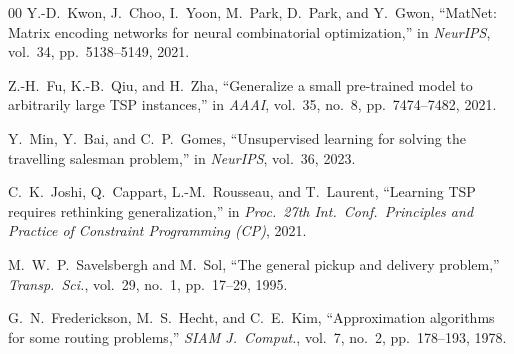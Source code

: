 \documentclass[conference]{IEEEtran}
\begin{document}
\begin{thebibliography}{00}
 Y.-D.~Kwon, J.~Choo, I.~Yoon, M.~Park, D.~Park, and Y.~Gwon, ``MatNet: Matrix encoding networks for neural combinatorial optimization,'' in \emph{NeurIPS}, vol.~34, pp.~5138--5149, 2021.

 Z.-H.~Fu, K.-B.~Qiu, and H.~Zha, ``Generalize a small pre-trained model to arbitrarily large TSP instances,'' in \emph{AAAI}, vol.~35, no.~8, pp.~7474--7482, 2021.

 Y.~Min, Y.~Bai, and C.~P.~Gomes, ``Unsupervised learning for solving the travelling salesman problem,'' in \emph{NeurIPS}, vol.~36, 2023.

 C.~K.~Joshi, Q.~Cappart, L.-M.~Rousseau, and T.~Laurent, ``Learning TSP requires rethinking generalization,'' in \emph{Proc.\ 27th Int.\ Conf.\ Principles and Practice of Constraint Programming (CP)}, 2021.

 M.~W.~P.~Savelsbergh and M.~Sol, ``The general pickup and delivery problem,'' \emph{Transp.\ Sci.}, vol.~29, no.~1, pp.~17--29, 1995.

 G.~N.~Frederickson, M.~S.~Hecht, and C.~E.~Kim, ``Approximation algorithms for some routing problems,'' \emph{SIAM J.\ Comput.}, vol.~7, no.~2, pp.~178--193, 1978.

\end{thebibliography}
\end{document}
